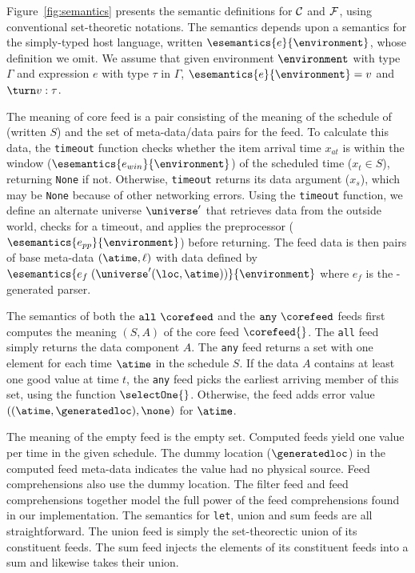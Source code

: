 Figure~\ref{fig:semantics} presents the semantic definitions for ${\cal
  C}$ and ${\cal F}$, using conventional set-theoretic notations.
The semantics depends upon a semantics for the simply-typed host
language, written $\esemantics{e}{\environment}$, whose definition we
omit. We assume that given environment $\environment$ with type
$\Gamma$ and expression $e$ with type $\tau$ in $\Gamma$,
$\esemantics{e}{\environment} = v$ and $\turn v : \tau$.

The meaning of core feed \corefeed{} is a pair consisting of the
meaning of the schedule of \corefeed{} (written $S$) and the set of
meta-data/data pairs for the feed. To calculate this data, the
\texttt{timeout} function checks whether the item arrival time
$x_{at}$ is within the window ($\esemantics{e_{win}}{\environment}$)
of the scheduled time ($x_t \in S$), returning \texttt{None} if
not. Otherwise, \texttt{timeout} returns its data argument ($x_s$),
which may be {\tt None} because of other networking errors.  Using the
\texttt{timeout} function, we define an alternate universe
$\universe'$ that retrieves data from the outside world, checks for a
timeout, and applies the preprocessor
($\esemantics{e_{pp}}{\environment}$) before returning.  The feed data
is then pairs of base meta-data $(\atime,\ell)$ with data defined by
$\esemantics{e_{f} \; (\universe'(\loc,\atime))}{\environment}$ where
$e_f$ is the \pads{}-generated parser.



The semantics of both the $\mathtt{all}\ \corefeed$ and the
$\mathtt{any}\ \corefeed$ feeds first computes the meaning $(S,A)$ of the
core feed $\corefeed{}$.  The \texttt{all} feed simply returns the
data component $A$.  The \texttt{any} feed returns a set with one
element for each time $\atime$ in the schedule $S$.  If the data $A$
contains at least one good value at time $t$, the \texttt{any} feed
picks the earliest arriving member of this set, using the function
$\selectOne{}$.  Otherwise, the feed adds  
error value $((\atime,\generatedloc), \none)$ for $\atime$.

The meaning of the empty feed is the empty set.  Computed feeds yield
one value per time in the given schedule.  The dummy location
($\generatedloc$) in the computed feed meta-data indicates the value had no physical
source.  Feed comprehensions also use the dummy location.  The filter feed and feed
comprehensions together model the full power of the feed
comprehensions found in our implementation. The semantics for
\texttt{let}, union and sum feeds are all straightforward.  The union
feed is simply the set-theorectic union of its constituent feeds.  The
sum feed injects the elements of its constituent feeds into a sum and
likewise takes their union.

